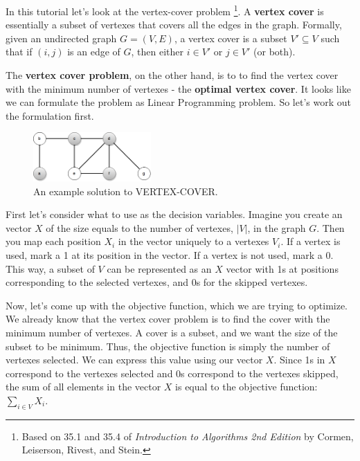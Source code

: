\documentclass{article}
\begin{document}
In this tutorial let's look at the vertex-cover problem 
\footnote{Based on 35.1 and 35.4 of {\it Introduction to Algorithms
2nd Edition} by Cormen, Leiserson, Rivest, and Stein.}. 
A {\bf vertex cover} is essentially a subset of vertexes that covers all the 
edges in the graph.
Formally, given an undirected graph $G = (V, E)$, a vertex cover is a subset
$V' \subseteq V$ such that if $(i, j)$ is an edge of $G$, then either
$i \in V'$ or $j \in V'$ (or both).

The {\bf vertex cover problem}, on the other hand, is to to find the vertex
cover with the minimum number of vertexes - the {\bf optimal vertex cover}.
It looks like we can formulate the problem as Linear Programming problem.
So let's work out the formulation first.
\begin{figure}[H]
\centering
\includegraphics[width=0.4\textwidth]{vertexcover1.png}
\caption{An example solution to VERTEX-COVER.}
\end{figure}

First let's consider what to use as the decision variables.
Imagine you create an vector $X$ of the size equals to the number of vertexes, 
$|V|$, in the graph $G$. 
Then you map each position $X_i$ in the vector uniquely to a vertexes $V_i$.
If a vertex is used, mark a 1 at its position in the vector. If a vertex
is not used, mark a 0.
This way, a subset of $V$ can be represented as an $X$ vector with 1s at
positions corresponding to the selected vertexes, and 0s for the skipped
vertexes.

Now, let's come up with the objective function, which we are trying to optimize.
We already know that the vertex cover problem is to find the cover with
the minimum number of vertexes. A cover is a subset, and we want the size
of the subset to be minimum. Thus, the objective function is simply the
number of vertexes selected. We can express this value using our vector $X$.
Since 1s in $X$ correspond to the vertexes selected and 0s correspond to the
vertexes skipped, the sum of all elements in the vector $X$ is equal to the
objective function: $\sum_{i \in V} X_i$.
\end{document}
